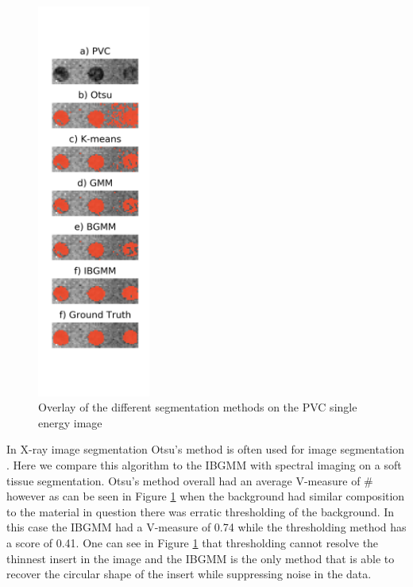 \documentclass[a4paper,11pt]{article}
\begin{document}
\begin{figure}
  
  \begin{center}
    \includegraphics[width=0.33\textwidth]{figures/otsu.png}
  \end{center}
  
  \caption{Overlay of the different segmentation methods on the PVC single energy image}
  
  \label{results:otsu}
\end{figure}

In X-ray image segmentation Otsu's method \cite{otsu} is often used for image segmentation \cite{Sund}. Here we compare this algorithm to the IBGMM with spectral imaging on a soft tissue segmentation. Otsu's method overall had an average V-measure of \# however as can be seen in Figure \ref{results:otsu} when the background had similar composition to the material in question there was erratic thresholding of the background. In this case the IBGMM had a V-measure of 0.74 while the thresholding method has a score of 0.41. One can see in Figure \ref{results:otsu} that thresholding cannot resolve the thinnest insert in the image and the IBGMM is the only method that is able to recover the circular shape of the insert while suppressing noise in the data.
\end{document}
